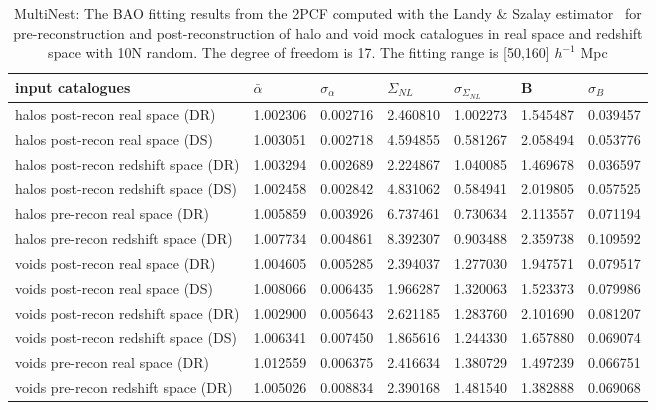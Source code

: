 \begin{table*}
\caption{MultiNest: The BAO fitting results from the 2PCF computed with the Landy $\&$ Szalay estimator~\cite{Landy1993} for pre-reconstruction and  post-reconstruction of halo and void mock catalogues in real space and redshift space with 10N random. The degree of freedom is 17. The fitting range is [50,160] $h^{-1}$ Mpc}
\label{tab:LS}
\begin{tabular}{lllllll}
\hline
input catalogues                     &$\bar{\alpha}$&$\sigma_{\alpha}$&     $\Sigma_{NL}$ & $\sigma_{\Sigma_{NL}}$&      B   & $\sigma_B$  \\
\hline
halos post-recon real space (DR)     & 1.002306 & 0.002716 & 2.460810 & 1.002273 & 1.545487 & 0.039457 \\
halos post-recon real space (DS)     & 1.003051 & 0.002718 & 4.594855 & 0.581267 & 2.058494 & 0.053776 \\
halos post-recon redshift space (DR) & 1.003294 & 0.002689 & 2.224867 & 1.040085 & 1.469678 & 0.036597 \\
halos post-recon redshift space (DS) & 1.002458 & 0.002842 & 4.831062 & 0.584941 & 2.019805 & 0.057525 \\
halos pre-recon real space (DR)      & 1.005859 & 0.003926 & 6.737461 & 0.730634 & 2.113557 & 0.071194 \\
halos pre-recon redshift space (DR)  & 1.007734 & 0.004861 & 8.392307 & 0.903488 & 2.359738 & 0.109592 \\
\hline
voids post-recon real space (DR)     & 1.004605 & 0.005285 & 2.394037 & 1.277030 & 1.947571 & 0.079517 \\
voids post-recon real space (DS)     & 1.008066 & 0.006435 & 1.966287 & 1.320063 & 1.523373 & 0.079986 \\
voids post-recon redshift space (DR) & 1.002900 & 0.005643 & 2.621185 & 1.283760 & 2.101690 & 0.081207 \\
voids post-recon redshift space (DS) & 1.006341 & 0.007450 & 1.865616 & 1.244330 & 1.657880 & 0.069074 \\
voids pre-recon real space (DR)      & 1.012559 & 0.006375 & 2.416634 & 1.380729 & 1.497239 & 0.066751 \\
voids pre-recon redshift space (DR)  & 1.005026 & 0.008834 & 2.390168 & 1.481540 & 1.382888 & 0.069068 \\
\hline
\end{tabular}
\end{table*}

